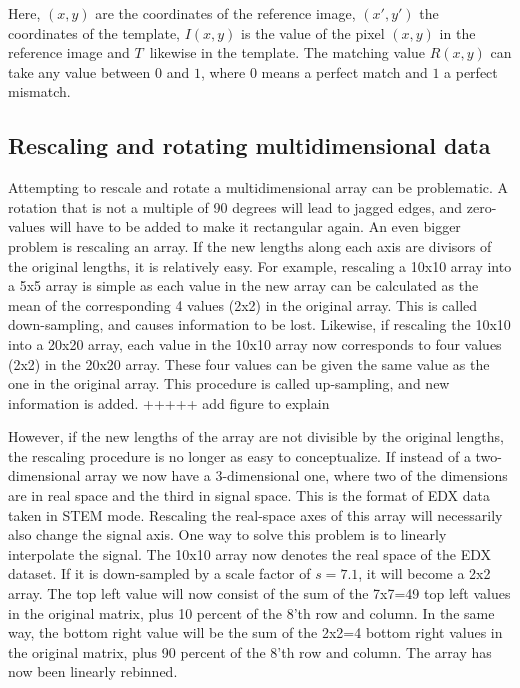 Here, $(x,y)$ are the coordinates of the reference image, $(x',y')$ the coordinates of the template, $I(x,y)$ is the value of the pixel $(x,y)$ in the reference image and $T$ likewise in the template. The matching value $R(x,y)$ can take any value between $0$ and $1$, where $0$ means a perfect match and $1$ a perfect mismatch.

	\subsection{Rescaling and rotating multidimensional data}
Attempting to rescale and rotate a multidimensional array can be problematic. A rotation that is not a multiple of 90 degrees will lead to jagged edges, and zero-values will have to be added to make it rectangular again. An even bigger problem is rescaling an array. If the new lengths along each axis are divisors of the original lengths, it is relatively easy. For example, rescaling a 10x10 array into a 5x5 array is simple as each value in the new array can be calculated as the mean of the corresponding 4 values (2x2) in the original array. This is called down-sampling, and causes information to be lost. Likewise, if rescaling the 10x10 into a 20x20 array, each value in the 10x10 array now corresponds to four values (2x2) in the 20x20 array. These four values can be given the same value as the one in the original array. This procedure is called up-sampling, and new information is added.
+++++ add figure to explain

However, if the new lengths of the array are not divisible by the original lengths, the rescaling procedure is no longer as easy to conceptualize. If instead of a two-dimensional array we now have a 3-dimensional one, where two of the dimensions are in real space and the third in signal space. This is the format of EDX data taken in STEM mode. Rescaling the real-space axes of this array will necessarily also change the signal axis. One way to solve this problem is to linearly interpolate the signal. The 10x10 array now denotes the real space of the EDX dataset. If it is down-sampled by a scale factor of $s=7.1$, it will become a 2x2 array. The top left value will now consist of the sum of the 7x7=49 top left values in the original matrix, plus 10 percent of the 8'th row and column. In the same way, the bottom right value will be the sum of the 2x2=4 bottom right values in the original matrix, plus 90 percent of the 8'th row and column. The array has now been linearly rebinned. 
